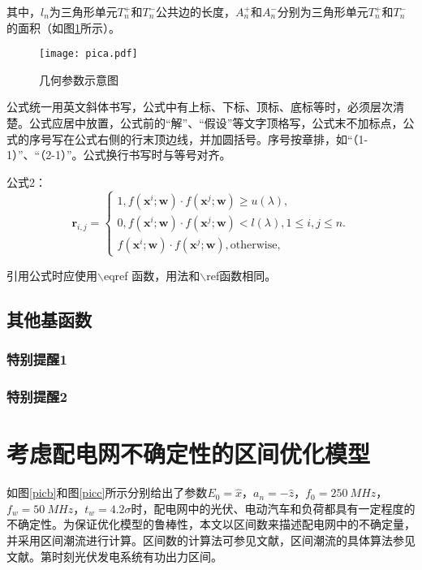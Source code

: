 \documentclass[bachelor]{NCEPU-thesis}
\begin{document}
其中，$l_n$为三角形单元$T_n^+$和$T_n^-$公共边的长度，$A_n^+$和$A_n^-$分别为三角形单元$T_n^+$和$T_n^-$的面积（如图\ref{pica}所示）。

\begin{figure}[h]
	\texttt{[image: pica.pdf]}
	\caption{几何参数示意图}
	\label{pica}
\end{figure}

公式统一用英文斜体书写，公式中有上标、下标、顶标、底标等时，必须层次清楚。公式应居中放置，公式前的“解”、“假设”等文字顶格写，公式末不加标点，公式的序号写在公式右侧的行末顶边线，并加圆括号。序号按章排，如“（1-1）”、“（2-1）”。公式换行书写时与等号对齐。

公式2：
\begin{equation}
\label{latent_binary_variable}
\bm{r}_{i,j}=
\begin{cases}
1,f(\bm{x}^{i};\bm{w})\cdot f(\bm{x}^{j};\bm{w})\geq u(\lambda),\\
0,f(\bm{x}^{i};\bm{w})\cdot f(\bm{x}^{j};\bm{w})< l(\lambda), 1\leq i,j\leq n.\\
f(\bm{x}^{i};\bm{w})\cdot f(\bm{x}^{j};\bm{w}),\text{otherwise},
\end{cases}
\end{equation}

引用公式时应使用$\backslash$eqref 函数，用法和$\backslash$ref函数相同。

\subsection{其他基函数}

\subsubsection{特别提醒1}

\subsubsection{特别提醒2}

\section{考虑配电网不确定性的区间优化模型}

如图\ref{picb}和图\ref{picc}所示分别给出了参数$E_0=\hat{x}$，$a_n=-\hat{z}$，$f_0=\SI{250}{MHz}$，$f_w=\SI{50}{MHz}$，$t_w=4.2\sigma$时，配电网中的光伏、电动汽车和负荷都具有一定程度的不确定性。为保证优化模型的鲁棒性，本文以区间数来描述配电网中的不确定量，并采用区间潮流进行计算。区间数的计算法可参见文献，区间潮流的具体算法参见文献。第时刻光伏发电系统有功出力区间。
\end{document}
